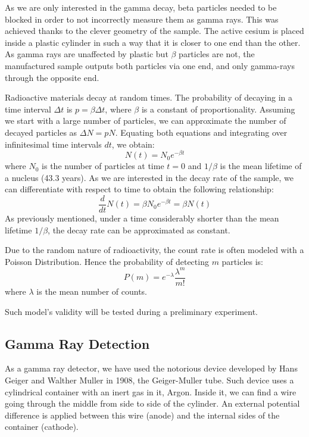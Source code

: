 \documentclass[a4paper]{article}
\begin{document}
As we are only interested in the gamma decay, beta particles needed to be blocked in order to not incorrectly measure them as gamma rays. This was achieved thanks to the clever geometry of the sample. The active cesium is placed inside a plastic cylinder in such a way that it is closer to one end than the other. As gamma rays are unaffected by plastic but $\beta$ particles are not, the manufactured sample outputs both particles via one end, and only gamma-rays through the opposite end.
  
  Radioactive materials decay at random times. The probability of decaying in a time interval $\Delta t$ is $p=\beta \Delta t$, where $\beta$ is a constant of proportionality. Assuming we start with a large number of particles, we can approximate the number of decayed particles as $\Delta N=pN$. Equating both equations and integrating over infinitesimal time intervals $dt$, we obtain:
  \begin{equation} 
  \label{nuclei} 
  N(t)=N_0e^{-\beta t}
  \end{equation}
  where $N_0$ is the number of particles at time $t=0$ and $1/\beta$ is the mean lifetime of a nucleus (43.3 years).
  As we are interested in the decay rate of the sample, we can differentiate with respect to time to obtain the following relationship:
  \begin{equation} 
  \label{decayrate} 
  \frac{d}{dt}N(t)=\beta N_0e^{-\beta t}=\beta N(t)
  \end{equation}
  As previously mentioned, under a time considerably shorter than the mean lifetime $1/\beta$, the decay rate can be approximated as constant.
  
  Due to the random nature of radioactivity, the count rate is often modeled with a Poisson Distribution. Hence the probability of detecting $m$ particles is:
  \begin{equation} 
  \label{decayrate} 
  P(m)=e^{-\lambda}\frac{\lambda^{m}}{m!}
  \end{equation}
where $\lambda$ is the mean number of counts. 

Such model's validity will be tested during a preliminary experiment.
  \subsection{Gamma Ray Detection}
  As a gamma ray detector, we have used the notorious device developed by Hans Geiger and Walther Muller in 1908, the Geiger-Muller tube. Such device uses a cylindrical container with an inert gas in it, Argon. Inside it, we can find a wire going through the middle from side to side of the cylinder. An external potential difference is applied between this wire (anode) and the internal sides of the container (cathode). 
 
\end{document}
